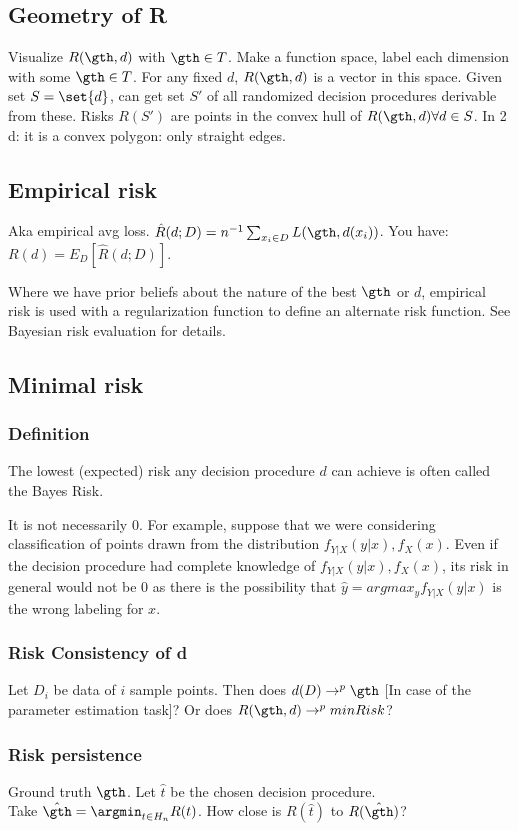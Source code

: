 \documentclass[oneside, article]{memoir}
\begin{document}
\subsection{Geometry of R}
Visualize $R(\gth, d)$ with $\gth \in T$. Make a function space, label each dimension with some $\gth \in T$. For any fixed $d$, $R(\gth, d)$ is a vector in this space. Given set $S = \set{d}$, can get set $S'$ of all randomized decision procedures derivable from these. Risks $R(S')$ are points in the convex hull of $R(\gth, d) \forall d\in S$. In 2 d: it is a convex polygon: only straight edges.

\subsection{Empirical risk}
Aka empirical avg loss. $\hat{R}(d;D) = n^{-1}\sum_{x_i \in D} L(\gth, d(x_i))$. You have: $R(d) = E_D[\hat{R}(d;D)]$.

Where we have prior beliefs about the nature of the best $\gth$ or $d$, empirical risk is used with a regularization function to define an alternate risk function. See Bayesian risk evaluation for details.

\subsection{Minimal risk}
\subsubsection{Definition}
The lowest (expected) risk any decision procedure $d$ can achieve is often called the Bayes Risk.

It is not necessarily $0$. For example, suppose that we were considering classification of points drawn from the distribution $f_{Y|X}(y|x), f_X(x)$. Even if the decision procedure had complete knowledge of $f_{Y|X}(y|x), f_X(x)$, its risk in general would not be 0 as there is the possibility that $\hat{y} = argmax_y f_{Y|X}(y|x)$ is the wrong labeling for $x$.

\subsubsection{Risk Consistency of d}
Let $D_i$ be data of $i$ sample points. Then does $d(D) \to^p \gth$ [In case of the parameter estimation task]? Or does $R(\gth, d) \to^p minRisk$?

\subsubsection{Risk persistence}
Ground truth $\gth$. Let $\hat{t}$ be the chosen decision procedure. \\Take $\hat{\gth} = \argmin_{t\in H_n} R(t)$. How close is $R(\hat{t})$ to $R(\hat{\gth})$?
\end{document}
